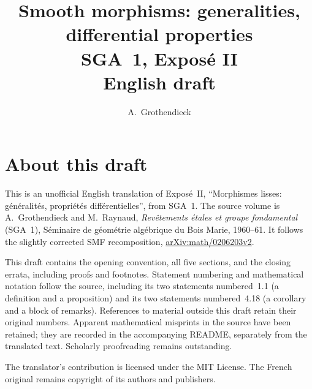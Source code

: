 \documentclass[11pt,a4paper,oneside]{amsbook}
\title[SGA~1, Expos\'e II (English draft)]{Smooth morphisms: generalities, differential properties\\
{\normalsize SGA~1, Expos\'e II\\English draft}}
\author{A.\ Grothendieck}
\date{}
\theoremstyle{plain}
\theoremstyle{definition}
\theoremstyle{remark}
\numberwithin{equation}{section}
\begin{document}
\frontmatter
\maketitle

\chapter*{About this draft}
This is an unofficial English translation of Expos\'e~II,
``Morphismes lisses: g\'en\'eralit\'es, propri\'et\'es diff\'erentielles'',
from SGA~1. The source volume is
A.\ Grothendieck and M.\ Raynaud,
\textit{Rev\^etements \'etales et groupe fondamental} (SGA~1),
S\'eminaire de g\'eom\'etrie alg\'ebrique du Bois Marie, 1960--61.
It follows the slightly corrected SMF recomposition,
\href{https://arxiv.org/abs/math/0206203v2}{arXiv:math/0206203v2}.

This draft contains the opening convention, all five sections,
and the closing errata, including proofs and footnotes.
Statement numbering and mathematical notation follow the source,
including its two statements numbered~1.1 (a definition and a
proposition) and its two statements numbered~4.18 (a corollary
and a block of remarks).
References to material outside this draft retain their original
numbers. Apparent mathematical misprints in the source have been
retained; they are recorded in the accompanying README, separately
from the translated text. Scholarly proofreading remains outstanding.

The translator's contribution is licensed under
the MIT License.
The French original remains copyright of its authors and publishers.

\tableofcontents
\mainmatter
\setcounter{chapter}{1}






\end{document}
